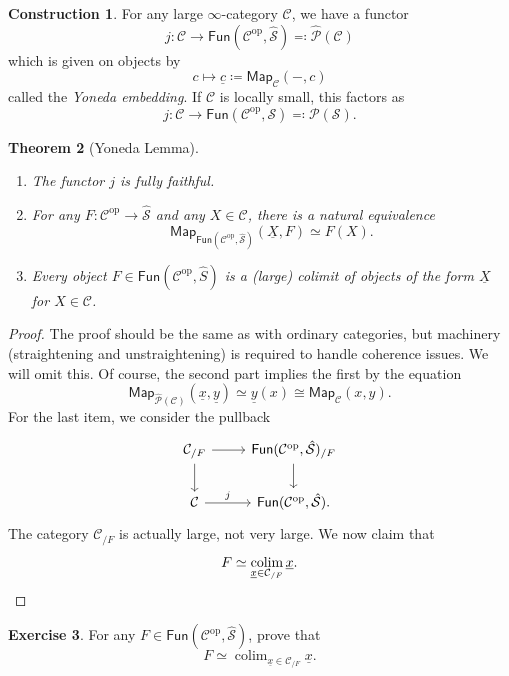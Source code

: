 \documentclass[10pt, oneside]{memoir}
\newtheorem{thm}{Theorem}[subsection]
\theoremstyle{definition}
\newtheorem{con}[thm]{Construction}
\newtheorem{exer}[thm]{Exercise}
\theoremstyle{remark}
\theoremstyle{plain}
\theoremstyle{definition}
\theoremstyle{remark}
\newcommand{\mc}[1]{\mathcal{#1}}
\newcommand{\ms}[1]{\mathsf{#1}}
\newcommand{\ul}[1]{\underline{#1}}
\newcommand{\1}{\mathbf{1}}
\newcommand{\2}{\mathbf{2}}
\newcommand{\3}{\mathbf{3}}
\DeclareMathOperator{\op}{op}
\DeclareMathOperator*{\colim}{colim}
\begin{document}
\begin{con}
    For any large \(\infty \)-category \(\mc{C} \), we have a functor
    \[ j \colon \mc{C} \to \ms{Fun}(\mc{C}^{\op}, \hat{\mc{S}}) \eqqcolon \hat{\mc{P}}(\mc{C}) \]
    which is given on objects by
    \[ c \mapsto \ul{c} \coloneqq \ms{Map}_{\mc{C}}(-, c) \]
    called the \textit{Yoneda embedding}. If \(\mc{C} \) is locally small, this factors as
    \[ j \colon \mc{C} \to \ms{Fun}(\mc{C}^{\op}, \mc{S}) \eqqcolon \mc{P}(\mc{S}). \]
\end{con}

\begin{thm}[Yoneda Lemma]\leavevmode
    \begin{enumerate}
        \item The functor \(j \) is fully faithful.
        \item For any \(F \colon \mc{C}^{\op} \to \hat{\mc{S}} \) and any \(X \in \mc{C} \), there is a natural equivalence
        \[ \ms{Map}_{\ms{Fun}(\mc{C}^{\op}, \hat{\mc{S}})}(\ul{X}, F) \simeq F(X). \]
        \item Every object \(F \in \ms{Fun}(\mc{C}^{\op}, \hat{S}) \) is a (large) colimit of objects of the form \(\ul{X} \) for \(X \in \mc{C} \).
    \end{enumerate}
\end{thm}

\begin{proof}
    The proof should be the same as with ordinary categories, but machinery (straightening and unstraightening) is required to handle coherence issues. We will omit this. Of course, the second part implies the first by the equation
    \[ \ms{Map}_{\hat{\mc{P}}(\mc{C})}(\ul{x}, \ul{y}) \simeq \ul{y}(x) \cong \ms{Map}_{\mc{C}}(x,y). \]
    For the last item, we consider the pullback
    \begin{equation*}
    \begin{tikzcd}
        \mc{C}_{/F} \ar{r} \ar{d} & \ms{Fun}(\mc{C}^{\op}, \hat{\mc{S}})_{/F} \ar{d} \\
        \mc{C} \ar{r}{j} & \ms{Fun}(\mc{C}^{\op}, \hat{\mc{S}}).
    \end{tikzcd}
    \end{equation*}
    The category \(\mc{C}_{/F} \) is actually large, not very large. We now claim that
    \[ F \simeq \colim_{\ul{x} \in \mc{C}_{/F}} \ul{x}. \qedhere \]
\end{proof}

\begin{exer}
    For any \(F \in \ms{Fun}(\mc{C}^{\op}, \hat{\mc{S}}) \), prove that
    \[ F \simeq \colim_{\ul{x} \in \mc{C}_{/F}} \ul{x}. \]
\end{exer}
\end{document}
